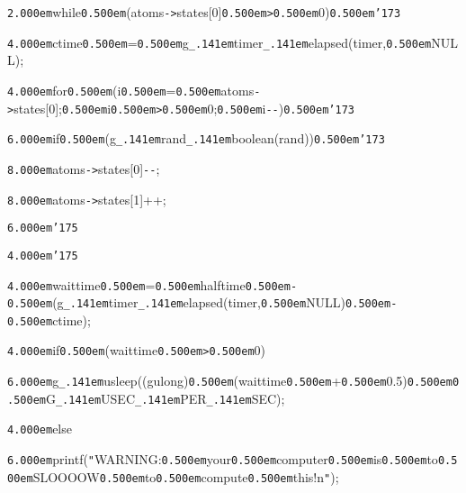 \noindent
{}\hfill

\noindent
{}{\tt\mc \kern2.000em}while{\tt\mc \kern0.500em}(atoms{\tt -}{\tt >}states[0]{\tt\mc \kern0.500em}{\tt >}{\tt\mc \kern0.500em}0){\tt\mc \kern0.500em}{\tt\char'173}

\noindent
{}{\tt\mc \kern4.000em}ctime{\tt\mc \kern0.500em}={\tt\mc \kern0.500em}g{\tt\_\kern.141em}timer{\tt\_\kern.141em}elapsed(timer,{\tt\mc \kern0.500em}NULL);

\noindent
{}\hfill

\noindent
{}{\tt\mc \kern4.000em}for{\tt\mc \kern0.500em}(i{\tt\mc \kern0.500em}={\tt\mc \kern0.500em}atoms{\tt -}{\tt >}states[0];{\tt\mc \kern0.500em}i{\tt\mc \kern0.500em}{\tt >}{\tt\mc \kern0.500em}0;{\tt\mc \kern0.500em}i{\tt -}{\tt -}){\tt\mc \kern0.500em}{\tt\char'173}

\noindent
{}{\tt\mc \kern6.000em}if{\tt\mc \kern0.500em}(g{\tt\_\kern.141em}rand{\tt\_\kern.141em}boolean(rand)){\tt\mc \kern0.500em}{\tt\char'173}

\noindent
{}{\tt\mc \kern8.000em}atoms{\tt -}{\tt >}states[0]{\tt -}{\tt -};

\noindent
{}{\tt\mc \kern8.000em}atoms{\tt -}{\tt >}states[1]++;

\noindent
{}{\tt\mc \kern6.000em}{\tt\char'175}

\noindent
{}{\tt\mc \kern4.000em}{\tt\char'175}

\noindent
{}\hfill

\noindent
{}{\tt\mc \kern4.000em}waittime{\tt\mc \kern0.500em}={\tt\mc \kern0.500em}halftime{\tt\mc \kern0.500em}{\tt -}{\tt\mc \kern0.500em}(g{\tt\_\kern.141em}timer{\tt\_\kern.141em}elapsed(timer,{\tt\mc \kern0.500em}NULL){\tt\mc \kern0.500em}{\tt -}{\tt\mc \kern0.500em}ctime);

\noindent
{}{\tt\mc \kern4.000em}if{\tt\mc \kern0.500em}(waittime{\tt\mc \kern0.500em}{\tt >}{\tt\mc \kern0.500em}0)

\noindent
{}{\tt\mc \kern6.000em}g{\tt\_\kern.141em}usleep((gulong){\tt\mc \kern0.500em}(waittime{\tt\mc \kern0.500em}+{\tt\mc \kern0.500em}0.5){\tt\mc \kern0.500em}{\tt *}{\tt\mc \kern0.500em}G{\tt\_\kern.141em}USEC{\tt\_\kern.141em}PER{\tt\_\kern.141em}SEC);

\noindent
{}{\tt\mc \kern4.000em}else

\noindent
{}{\tt\mc \kern6.000em}printf({\tt "}WARNING:{\tt\mc \kern0.500em}your{\tt\mc \kern0.500em}computer{\tt\mc \kern0.500em}is{\tt\mc \kern0.500em}to{\tt\mc \kern0.500em}SLOOOOW{\tt\mc \kern0.500em}to{\tt\mc \kern0.500em}compute{\tt\mc \kern0.500em}this!{\tt{}}n{\tt "});

